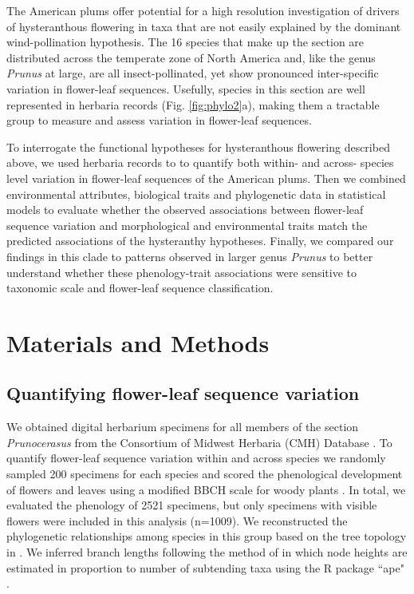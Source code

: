 \documentclass{article}[12pt]
\begin{document}
\noindent The American plums offer potential for a high resolution investigation of drivers of hysteranthous flowering in taxa that are not easily explained by the dominant wind-pollination hypothesis. The 16 species that make up the section are distributed across the temperate zone of North America and, like the genus \textit{Prunus} at large, are all insect-pollinated, yet show pronounced inter-specific variation in flower-leaf sequences. Usefully, species in this section are well represented in herbaria records (Fig. \ref{fig:phylo2}a), making them a tractable group to measure and assess variation in flower-leaf sequences.

\noindent To interrogate the functional hypotheses for hysteranthous flowering described above, we used herbaria records to to quantify both within- and across- species level variation in flower-leaf sequences of the American plums. Then we combined environmental attributes, biological traits and phylogenetic data in statistical models to evaluate whether the observed associations between flower-leaf sequence variation and morphological and environmental traits match the predicted associations of the hysteranthy hypotheses. Finally, we compared our findings in this clade to patterns observed in larger genus \emph{Prunus} to better understand whether these phenology-trait associations were sensitive to taxonomic scale and flower-leaf sequence classification.


\section*{Materials and Methods}
\subsection*{Quantifying flower-leaf sequence variation}  

We obtained digital herbarium specimens for all members of the section \textit{Prunocerasus} from the Consortium of Midwest Herbaria (CMH) Database \citep{CMH}. To quantify flower-leaf sequence variation within and across species we randomly sampled 200 specimens for each species and scored the phenological development of flowers and leaves using a modified BBCH scale for woody plants \citep{Finn2007}. In total, we evaluated the phenology of 2521 specimens, but only specimens with visible flowers were included in this analysis (n=1009). We reconstructed the phylogenetic relationships among species in this group based on the tree topology in \citet{Shaw:2004aa}. We inferred branch lengths following the method of \citet{Granfen1989} in which node heights are estimated in proportion to number of subtending taxa using the R package ``ape" \citep{Paradis2019}.
\end{document}
